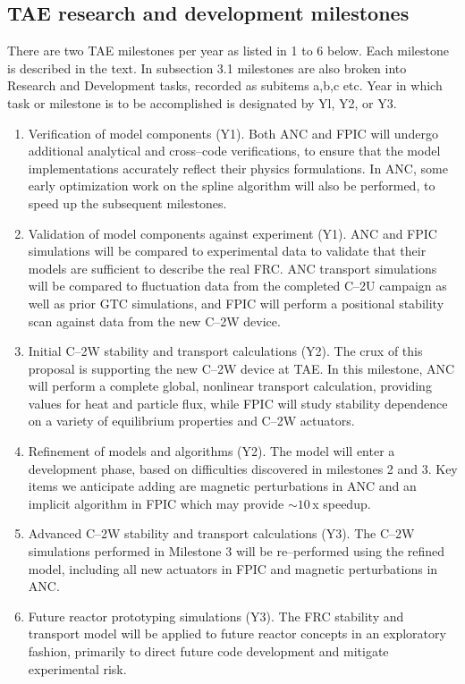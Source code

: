 \documentclass[a4paper,openany,12pt]{book}
\begin{document}
\subsection{TAE research and development milestones}

There are two TAE milestones per year as listed in 1 to 6 below. Each milestone is described in the text. In subsection 3.1 milestones are also broken into Research and Development tasks, recorded as subitems a,b,c etc. Year in which task or milestone is to be accomplished is designated by Yl, Y2, or Y3.
\begin{enumerate}
\item Verification of model components (Y1). Both ANC and FPIC will undergo additional analytical and cross--code verifications, to ensure that the model implementations accurately reflect their physics formulations. In ANC, some early optimization work on the spline algorithm will also be performed, to speed up the subsequent milestones.
\item Validation of model components against experiment (Y1). ANC and FPIC simulations will be compared to experimental data to validate that their models are sufficient to describe the real FRC. ANC transport simulations will be compared to fluctuation data from the completed C--2U campaign as well as prior GTC simulations, and FPIC will perform a positional stability scan against data from the new C--2W device.
\item Initial C--2W stability and transport calculations (Y2). The crux of this proposal is supporting the new C--2W device at TAE. In this milestone, ANC will perform a complete global, nonlinear transport calculation, providing values for heat and particle flux, while FPIC will study stability dependence on a variety of equilibrium properties and C--2W actuators.
\item Refinement of models and algorithms (Y2). The model will enter a development phase, based on difficulties discovered in milestones 2 and 3. Key items we anticipate adding are magnetic perturbations in ANC and an implicit algorithm in FPIC which may provide $\sim 10\,$x speedup.
\item Advanced C--2W stability and transport calculations (Y3). The C--2W simulations performed in Milestone 3 will be re--performed using the refined model, including all new actuators in FPIC and magnetic perturbations in ANC.
\item Future reactor prototyping simulations (Y3). The FRC stability and transport model will be applied to future reactor concepts in an exploratory fashion, primarily to direct future code development and mitigate experimental risk.
\end{enumerate}
\end{document}
